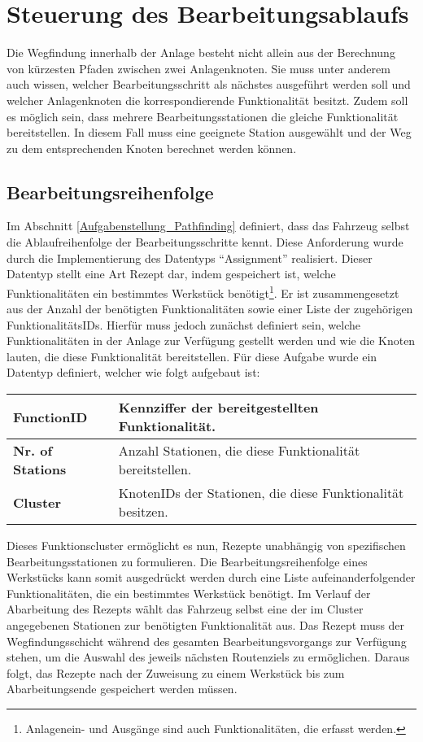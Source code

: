 	\section{Steuerung des Bearbeitungsablaufs}
		
		Die Wegfindung innerhalb der Anlage besteht nicht allein aus der Berechnung von kürzesten Pfaden zwischen zwei Anlagenknoten. Sie muss unter anderem auch wissen, welcher Bearbeitungsschritt als nächstes ausgeführt werden soll und welcher Anlagenknoten die korrespondierende Funktionalität besitzt. Zudem soll es möglich sein, dass mehrere Bearbeitungsstationen die gleiche Funktionalität bereitstellen. In diesem Fall muss eine geeignete Station ausgewählt und der Weg zu dem entsprechenden Knoten berechnet werden können.
	
		\subsection{Bearbeitungsreihenfolge}
			\label{Bearbeitungsreihenfolge}
			Im Abschnitt \ref{Aufgabenstellung_Pathfinding} definiert, dass das Fahrzeug selbst die Ablaufreihenfolge der Bearbeitungsschritte kennt. Diese Anforderung wurde durch die Implementierung des Datentyps "`Assignment"' realisiert. Dieser Datentyp stellt eine Art Rezept dar, indem gespeichert ist, welche Funktionalitäten ein bestimmtes Werkstück benötigt\footnote{Anlagenein- und Ausgänge sind auch Funktionalitäten, die erfasst werden.}. Er ist zusammengesetzt aus der Anzahl der benötigten Funktionalitäten sowie einer Liste der zugehörigen FunktionalitätsIDs. Hierfür muss jedoch zunächst definiert sein, welche Funktionalitäten in der Anlage zur Verfügung gestellt werden und wie die Knoten lauten, die diese Funktionalität bereitstellen. Für diese Aufgabe wurde ein Datentyp definiert, welcher wie folgt aufgebaut ist:
			
			\begin{longtable}{| l | l |}
				
				\hline
				\textbf{FunctionID} & Kennziffer der bereitgestellten Funktionalität.\\ \hline
				\textbf{Nr. of Stations} & Anzahl Stationen, die diese Funktionalität bereitstellen.\\ \hline
				\textbf{Cluster} & KnotenIDs der Stationen, die diese Funktionalität besitzen.\\
				\hline
				
			\end{longtable}
			
			Dieses Funktionscluster ermöglicht es nun, Rezepte unabhängig von spezifischen Bearbeitungsstationen zu formulieren. Die Bearbeitungsreihenfolge eines Werkstücks kann somit ausgedrückt werden durch eine Liste aufeinanderfolgender Funktionalitäten, die ein bestimmtes Werkstück benötigt. Im Verlauf der Abarbeitung des Rezepts wählt das Fahrzeug selbst eine der im Cluster angegebenen Stationen zur benötigten Funktionalität aus. Das Rezept muss der Wegfindungsschicht während des gesamten Bearbeitungsvorgangs zur Verfügung stehen, um die Auswahl des jeweils nächsten Routenziels zu ermöglichen. Daraus folgt, das Rezepte nach der Zuweisung zu einem Werkstück bis zum Abarbeitungsende gespeichert werden müssen.\\
			
